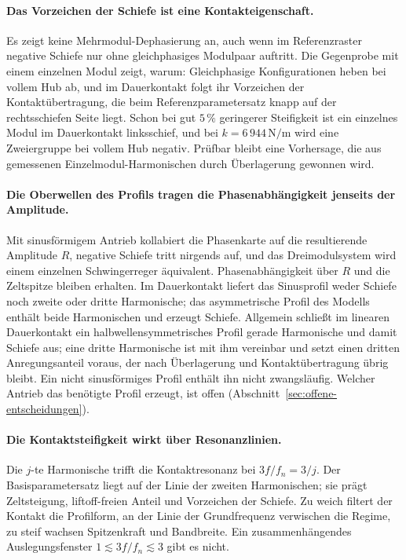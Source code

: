 \documentclass[12pt,a4paper]{report}
\begin{document}
\paragraph{Das Vorzeichen der Schiefe ist eine Kontakteigenschaft.} Es
zeigt keine Mehrmodul-Dephasierung an, auch wenn im Referenzraster
negative Schiefe nur ohne gleichphasiges Modulpaar auftritt. Die
Gegenprobe mit einem einzelnen Modul zeigt, warum: Gleichphasige Konfigurationen heben bei vollem Hub ab, und
im Dauerkontakt folgt ihr Vorzeichen der Kontaktübertragung, die beim
Referenzparametersatz knapp auf der rechtsschiefen Seite liegt. Schon bei
gut $5\,\%$ geringerer Steifigkeit ist ein einzelnes Modul im
Dauerkontakt linksschief, und bei $k = 6\,944\,\mathrm{N/m}$ wird eine
Zweiergruppe bei vollem Hub negativ. Prüfbar bleibt eine Vorhersage, die
aus gemessenen Einzelmodul-Harmonischen durch Überlagerung gewonnen wird.

\paragraph{Die Oberwellen des Profils tragen die Phasenabhängigkeit jenseits der Amplitude.}
Mit sinusförmigem Antrieb kollabiert die Phasenkarte auf die
resultierende Amplitude $R$, negative Schiefe tritt nirgends auf, und
das Dreimodulsystem wird einem einzelnen Schwingerreger äquivalent.
Phasenabhängigkeit über $R$ und die Zeltspitze bleiben erhalten. Im
Dauerkontakt liefert das Sinusprofil weder Schiefe noch zweite oder
dritte Harmonische; das asymmetrische Profil des Modells enthält beide
Harmonischen und erzeugt Schiefe. Allgemein schließt im linearen
Dauerkontakt ein halbwellensymmetrisches Profil gerade Harmonische und
damit Schiefe aus; eine dritte Harmonische ist mit ihm vereinbar und setzt
einen dritten Anregungsanteil voraus, der nach Überlagerung und
Kontaktübertragung übrig bleibt. Ein nicht sinusförmiges Profil enthält
ihn nicht zwangsläufig. Welcher Antrieb das benötigte Profil erzeugt, ist
offen (Abschnitt~\ref{sec:offene-entscheidungen}).

\paragraph{Die Kontaktsteifigkeit wirkt über Resonanzlinien.} Die
$j$-te Harmonische trifft die Kontaktresonanz bei $3f/f_n = 3/j$. Der
Basisparametersatz liegt auf der Linie der zweiten Harmonischen; sie
prägt Zeltsteigung, liftoff-freien Anteil und Vorzeichen der Schiefe. Zu
weich filtert der Kontakt die Profilform, an der Linie der Grundfrequenz
verwischen die Regime, zu steif wachsen Spitzenkraft und Bandbreite. Ein
zusammenhängendes Auslegungsfenster $1 \lesssim 3f/f_n \lesssim 3$ gibt
es nicht.
\end{document}
